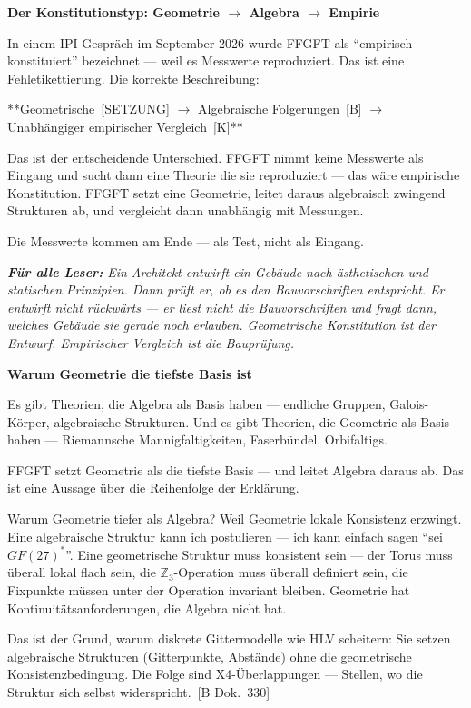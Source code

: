 \documentclass[11pt,oneside]{book}
\newcommand{\status}[1]{\penalty10000\,{\scriptsize\textcolor{gray!60}{[#1]}}}
\newenvironment{laierspur}{%
  \par\vspace{4pt}%
  \noindent\small\itshape\color{blue!60!black}%
  \textbf{Für alle Leser:}\enspace\ignorespaces}{%
  \par\vspace{4pt}\normalsize\normalfont\normalcolor}
\begin{document}
\textbf{Der Konstitutionstyp: Geometrie $\to$ Algebra $\to$ Empirie}


In einem IPI-Gespräch im September 2026 wurde FFGFT als \enquote{empirisch
konstituiert} bezeichnet — weil es Messwerte reproduziert. Das ist
eine Fehletikettierung. Die korrekte Beschreibung:


**Geometrische \status{SETZUNG} $\to$ Algebraische Folgerungen \status{B} $\to$ Unabhängiger
empirischer Vergleich \status{K}**


Das ist der entscheidende Unterschied. FFGFT nimmt keine Messwerte
als Eingang und sucht dann eine Theorie die sie reproduziert — das
wäre empirische Konstitution. FFGFT setzt eine Geometrie, leitet
daraus algebraisch zwingend Strukturen ab, und vergleicht dann
unabhängig mit Messungen.


Die Messwerte kommen am Ende — als Test, nicht als Eingang.


\begin{laierspur}
Ein Architekt entwirft ein Gebäude nach ästhetischen
und statischen Prinzipien. Dann prüft er, ob es den Bauvorschriften
entspricht. Er entwirft nicht rückwärts — er liest nicht die
Bauvorschriften und fragt dann, welches Gebäude sie gerade noch
erlauben. Geometrische Konstitution ist der Entwurf. Empirischer
Vergleich ist die Bauprüfung.
\end{laierspur}

\textbf{Warum Geometrie die tiefste Basis ist}


Es gibt Theorien, die Algebra als Basis haben — endliche Gruppen,
Galois-Körper, algebraische Strukturen. Und es gibt Theorien, die
Geometrie als Basis haben — Riemannsche Mannigfaltigkeiten, Faserbündel,
Orbifaltigs.


FFGFT setzt Geometrie als die tiefste Basis — und leitet Algebra daraus
ab. Das ist eine Aussage über die Reihenfolge der Erklärung.


Warum Geometrie tiefer als Algebra? Weil Geometrie lokale Konsistenz
erzwingt. Eine algebraische Struktur kann ich postulieren — ich kann
einfach sagen \enquote{sei $GF(27)^*$}. Eine geometrische Struktur muss konsistent
sein — der Torus muss überall lokal flach sein, die $\mathbb{Z}_3$-Operation muss
überall definiert sein, die Fixpunkte müssen unter der Operation invariant
bleiben. Geometrie hat Kontinuitätsanforderungen, die Algebra nicht hat.


Das ist der Grund, warum diskrete Gittermodelle wie HLV scheitern: Sie
setzen algebraische Strukturen (Gitterpunkte, Abstände) ohne die
geometrische Konsistenzbedingung. Die Folge sind X4-Überlappungen —
Stellen, wo die Struktur sich selbst widerspricht. \status{B Dok.~330}
\end{document}
